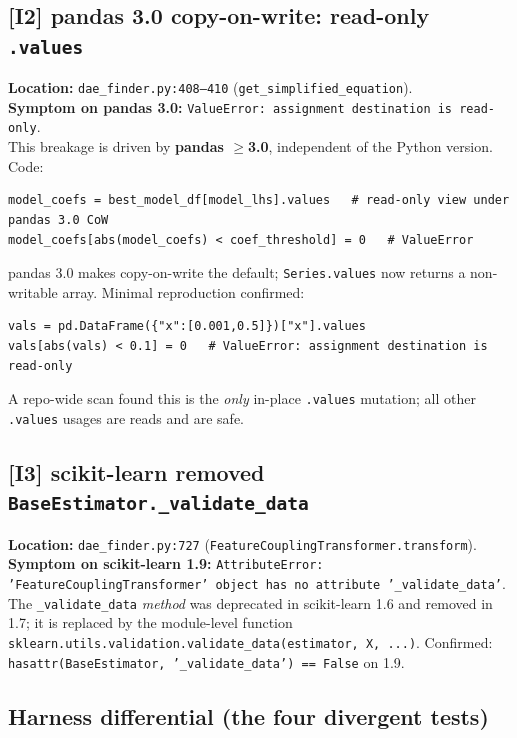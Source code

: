\documentclass[11pt]{article}
\newcommand{\code}[1]{\texttt{\small #1}}
\begin{document}
\subsection*{[I2] pandas 3.0 copy-on-write: read-only \code{.values}}

\textbf{Location:} \code{dae\_finder.py:408--410} (\code{get\_simplified\_equation}).\\
\textbf{Symptom on pandas 3.0:} \code{ValueError: assignment destination is read-only}.\\
This breakage is driven by \textbf{pandas $\ge$3.0}, independent of the Python
version. Code:
\begin{lstlisting}
model_coefs = best_model_df[model_lhs].values   # read-only view under pandas 3.0 CoW
model_coefs[abs(model_coefs) < coef_threshold] = 0   # ValueError
\end{lstlisting}
pandas 3.0 makes copy-on-write the default; \code{Series.values} now returns a
non-writable array. Minimal reproduction confirmed:
\begin{lstlisting}
vals = pd.DataFrame({"x":[0.001,0.5]})["x"].values
vals[abs(vals) < 0.1] = 0   # ValueError: assignment destination is read-only
\end{lstlisting}
A repo-wide scan found this is the \emph{only} in-place \code{.values} mutation;
all other \code{.values} usages are reads and are safe.

\subsection*{[I3] scikit-learn removed \code{BaseEstimator.\_validate\_data}}

\textbf{Location:} \code{dae\_finder.py:727} (\code{FeatureCouplingTransformer.transform}).\\
\textbf{Symptom on scikit-learn 1.9:}
\code{AttributeError: 'FeatureCouplingTransformer' object has no attribute '\_validate\_data'}.\\
The \code{\_validate\_data} \emph{method} was deprecated in scikit-learn 1.6 and
removed in 1.7; it is replaced by the module-level function
\code{sklearn.utils.validation.validate\_data(estimator, X, ...)}. Confirmed:
\code{hasattr(BaseEstimator, '\_validate\_data') == False} on 1.9.

\subsection{Harness differential (the four divergent tests)}
\end{document}
